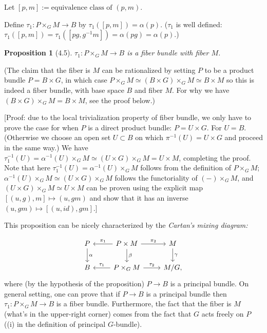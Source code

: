 \documentclass{article}
\theoremstyle{mystyle}
\newtheorem*{proposition*}{Proposition}
\theoremstyle{remark}
\numberwithin{equation}{section}
\begin{document}
Let $[p,m]:=\text{equivalence class of }(p,m)$.

Define $\tau_1\colon P\times _GM\rightarrow B$ by $\tau_1([p,m]) = \alpha(p)$. ($\tau_1$ is well defined: $\tau_1([p,m]) = \tau_1([pg,g^{-1}m]) = \alpha(pg) = \alpha(p)$.)

\begin{proposition*}[4.5] $\tau_1\colon P\times_G M\rightarrow B$ is a fiber bundle with fiber $M$. 
\end{proposition*}

(The claim that the fiber is $M$ can be rationalized by setting $P$ to be a product bundle $P = B\times G$, in which case $P\times_GM \simeq (B\times G)\times_GM \simeq B\times M$ so this is indeed a fiber bundle, with base space $B$ and fiber $M$. For why we have $(B\times G)\times_GM = B\times M$, see the proof below.)

[Proof: due to the local trivialization property of fiber bundle, we only have to prove the case for when $P$ is a direct product bundle: $P = U\times G$. For $U=B$. (Otherwise we choose an open set $U\subset B$ on which $\pi^{-1}(U) = U\times G$ and proceed in the same way.) We have $\tau_1^{-1}(U) = \alpha^{-1}(U)\times_G M \simeq (U\times G)\times_G M = U\times M$, completing the proof. Note that here $\tau_1^{-1}(U) = \alpha^{-1}(U)\times_G M$ follows from the definition of $P\times_GM$; $\alpha^{-1}(U)\times_GM\simeq (U\times G)\times_GM$ follows the functoriality of $(-)\times_GM$, and $(U\times G)\times_G M\simeq U\times M$ can be proven using the explicit map $[(u,g),m]\mapsto (u,gm)$ and show that it has an inverse $(u,gm)\mapsto [(u,id),gm]$.]

This proposition can be nicely characterized by the \emph{Cartan's mixing diagram:}


\begin{equation}\label{Cartan_mixing_diagram}
\begin{tikzcd}
P  \ar[d,"\alpha"] & \ar[l,"\pi_1"']P\times M \ar[r,"\pi_2"]\ar[d,"\beta"] & M \ar[d,"\gamma"]\\
B & \ar[l,"\tau_1"']P\times_G M \ar[r,"\tau_2 "] & M/G ,
\end{tikzcd}
\end{equation}
where (by the hypothesis of the proposition) $P\rightarrow B$ is a principal bundle. On general setting, one can prove that if $P\rightarrow B$ is a principal bundle then $\tau_1\colon P\times_G M\rightarrow B$ is a fiber bundle. Furthermore, the fact that the fiber is $M$ (what's in the upper-right corner) comes from the fact that $G$ acts freely on $P$ ((i) in the definition of principal $G$-bundle).
\end{document}

